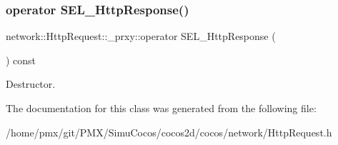 \subsubsection{\texorpdfstring{operator S\+E\+L\+\_\+\+Http\+Response()}{operator SEL\_HttpResponse()}}
{\footnotesize\ttfamily network\+::\+Http\+Request\+::\+\_\+prxy\+::operator S\+E\+L\+\_\+\+Http\+Response (\begin{DoxyParamCaption}{ }\end{DoxyParamCaption}) const\hspace{0.3cm}{\ttfamily [inline]}}

Destructor. 

The documentation for this class was generated from the following file\+:\begin{DoxyCompactItemize}
\item 
/home/pmx/git/\+P\+M\+X/\+Simu\+Cocos/cocos2d/cocos/network/Http\+Request.\+h\end{DoxyCompactItemize}
